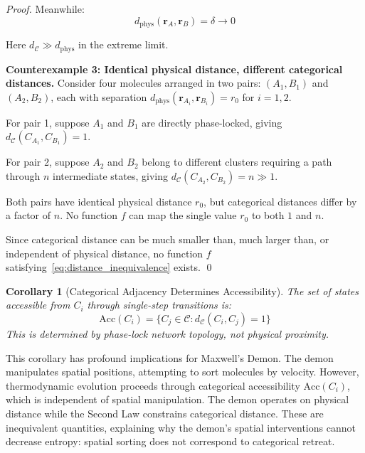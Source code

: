 \documentclass[12pt,a4paper]{article}
\newtheorem{corollary}[theorem]{Corollary}
\theoremstyle{definition}
\theoremstyle{remark}
\newcommand{\catspace}{\mathcal{C}}
\newcommand{\accessible}{\text{Acc}}
\begin{document}
\begin{proof}
Meanwhile:
\begin{equation}
d_{\text{phys}}(\mathbf{r}_A, \mathbf{r}_B) = \delta \to 0
\end{equation}

Here $d_{\catspace} \gg d_{\text{phys}}$ in the extreme limit.

\textbf{Counterexample 3: Identical physical distance, different categorical distances.}
Consider four molecules arranged in two pairs: $(A_1, B_1)$ and $(A_2, B_2)$, each with separation $d_{\text{phys}}(\mathbf{r}_{A_i}, \mathbf{r}_{B_i}) = r_0$ for $i = 1, 2$.

For pair 1, suppose $A_1$ and $B_1$ are directly phase-locked, giving $d_{\catspace}(C_{A_1}, C_{B_1}) = 1$.

For pair 2, suppose $A_2$ and $B_2$ belong to different clusters requiring a path through $n$ intermediate states, giving $d_{\catspace}(C_{A_2}, C_{B_2}) = n \gg 1$.

Both pairs have identical physical distance $r_0$, but categorical distances differ by a factor of $n$. No function $f$ can map the single value $r_0$ to both $1$ and $n$.

Since categorical distance can be much smaller than, much larger than, or independent of physical distance, no function $f$ satisfying~\eqref{eq:distance_inequivalence} exists. \qed
\end{proof}

\begin{corollary}[Categorical Adjacency Determines Accessibility]
\label{cor:adjacency_accessibility}
The set of states accessible from $C_i$ through single-step transitions is:
\begin{equation}
\accessible(C_i) = \{C_j \in \catspace : d_{\catspace}(C_i, C_j) = 1\}
\end{equation}
This is determined by phase-lock network topology, not physical proximity.
\end{corollary}

This corollary has profound implications for Maxwell's Demon. The demon manipulates spatial positions, attempting to sort molecules by velocity. However, thermodynamic evolution proceeds through categorical accessibility $\accessible(C_i)$, which is independent of spatial manipulation. The demon operates on physical distance while the Second Law constrains categorical distance. These are inequivalent quantities, explaining why the demon's spatial interventions cannot decrease entropy: spatial sorting does not correspond to categorical retreat.
\end{document}
